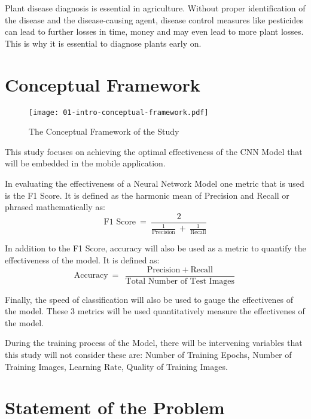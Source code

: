 \bigskip


Plant disease diagnosis is essential in agriculture. Without proper 
identification of the disease and the disease-causing agent, disease 
control measures like pesticides can lead to further losses in time,
money and may even lead to more plant losses. This is why it is essential
to diagnose plants early on.  

\bigskip

\section{Conceptual Framework}

\begin{figure}[H]
      \centering
      \texttt{[image: 01-intro-conceptual-framework.pdf]}
      \caption{The Conceptual Framework of the Study}
\end{figure}

This study focuses on achieving the optimal effectiveness of the CNN Model that 
will be embedded in the mobile application.  

\bigskip

In evaluating the effectiveness of a Neural Network Model 
one metric that is used is the F1 Score. It is defined as the harmonic mean 
of Precision and Recall or phrased mathematically as:
\[ 
 \text{F1 Score} \: = \: \frac{2}{\frac{1}{\text{Precision}} \: + \: 
\frac{1}{\text{Recall}}} 
\]

In addition to the F1 Score, accuracy will also be used as a metric to 
quantify the effectiveness of the model. It is defined as:
\[
      \text{Accuracy} \: = \: \frac{\text{Precision} \: + \: 
      \text{Recall}}{\text{Total Number of Test Images}}
\]

Finally, the speed of classification will also be used to 
gauge the effectivenes of the model. These 3 metrics will be used 
quantitatively measure the effectivenes of the model. 

\bigskip

During the training process of the Model, there will be intervening variables 
that this study will not consider these are: Number of Training Epochs, 
Number of Training Images, Learning Rate, Quality of Training Images.




\section{Statement of the Problem}

